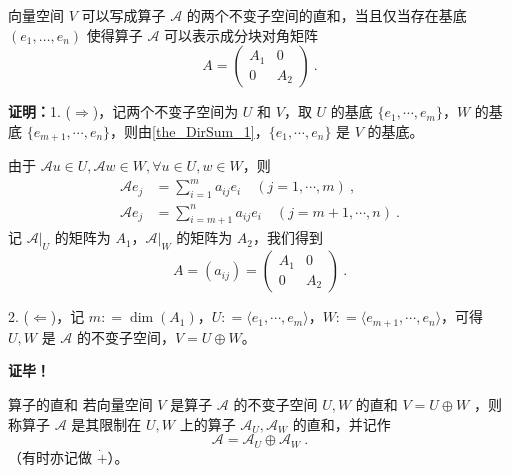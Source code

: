 \begin{theorem}{}\label{the_InvSP_1}
向量空间 $V$ 可以写成算子 $\mathcal{A}$ 的两个不变子空间的直和，当且仅当存在基底 $(e_1, \dots, e_n)$ 使得算子 $\mathcal{A}$ 可以表示成分块对角矩阵
\begin{equation}
A=\begin{pmatrix}
A_1 & 0\\
0 & A_2
\end{pmatrix}~.
\end{equation}

\end{theorem}

\textbf{证明：}1. ($\Rightarrow$)，记两个不变子空间为 $U$ 和 $V$，取 $U$ 的基底 $\{e_1 ,\cdots, e_m\}$，$W$ 的基底 $\{e_{m+1}, \cdots, e_n\}$，则由\autoref{the_DirSum_1}，$\{e_{1}, \cdots, e_n\}$ 是 $V$ 的基底。

由于 $\mathcal{A}u\in U, \mathcal{A} w\in W,\forall  u\in U, w\in W$，则
\begin{equation}\label{eq_InvSP_2}
\begin{aligned}
\mathcal{A} e_j&=\sum_{i=1}^m a_{ij} e_i\quad (j=1,\cdots ,m)~,\\
\mathcal{A} e_j&=\sum_{i=m+1}^n a_{ij} e_i\quad (j=m+1,\cdots ,n)~.
\end{aligned}
\end{equation}
记 $\mathcal{A}|_U$ 的矩阵为 $A_1$，$\mathcal{A}|_W$ 的矩阵为 $A_2$，我们得到
\begin{equation}
A=(a_{ij})=\begin{pmatrix}
A_1 & 0\\
0 & A_2
\end{pmatrix}~.
\end{equation}

2. ($\Leftarrow$)，记 $m: = \dim(A_1)$，$U: = \langle e_1, \cdots, e_m\rangle$，$W: = \langle e_{m + 1}, \cdots, e_n\rangle$，可得 $U, W$ 是 $\mathcal{A}$ 的不变子空间，$V = U \oplus W$。

\textbf{证毕！}

\begin{definition}{算子的直和}
若向量空间 $V$ 是算子 $\mathcal{A}$ 的不变子空间 $U,W$ 的直和 $V=U\oplus W$ ，则称算子 $\mathcal{A}$ 是其限制在 $U,W$ 上的算子 $\mathcal{A}_U,\mathcal{A}_W$ 的直和，并记作
\begin{equation}
\mathcal{A}=\mathcal{A}_U \oplus \mathcal{A}_W~.
\end{equation}
（有时亦记做 $\dot{+}$）。

\end{definition}
